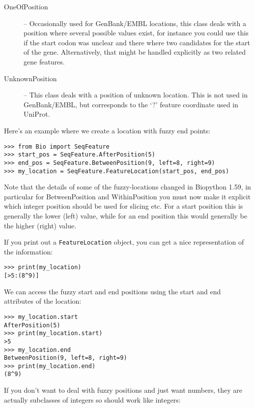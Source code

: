 \begin{description}
  \item[OneOfPosition] -- Occasionally used for GenBank/EMBL locations,
  this class deals with a position where several possible values exist,
  for instance you could use this if the start codon was unclear and
  there where two candidates for the start of the gene. Alternatively,
  that might be handled explicitly as two related gene features.

  \item[UnknownPosition] -- This class deals with a position of unknown
  location. This is not used in GenBank/EMBL, but corresponds to the `?'
  feature coordinate used in UniProt.

\end{description}

Here's an example where we create a location with fuzzy end points:

\begin{verbatim}
>>> from Bio import SeqFeature
>>> start_pos = SeqFeature.AfterPosition(5)
>>> end_pos = SeqFeature.BetweenPosition(9, left=8, right=9)
>>> my_location = SeqFeature.FeatureLocation(start_pos, end_pos)
\end{verbatim}

Note that the details of some of the fuzzy-locations changed in Biopython 1.59,
in particular for BetweenPosition and WithinPosition you must now make it explicit
which integer position should be used for slicing etc. For a start position this
is generally the lower (left) value, while for an end position this would generally
be the higher (right) value.

If you print out a \verb|FeatureLocation| object, you can get a nice representation of the information:

\begin{verbatim}
>>> print(my_location)
[>5:(8^9)]
\end{verbatim}

We can access the fuzzy start and end positions using the start and end attributes of the location:

\begin{verbatim}
>>> my_location.start
AfterPosition(5)
>>> print(my_location.start)
>5
>>> my_location.end
BetweenPosition(9, left=8, right=9)
>>> print(my_location.end)
(8^9)
\end{verbatim}

If you don't want to deal with fuzzy positions and just want numbers,
they are actually subclasses of integers so should work like integers:

